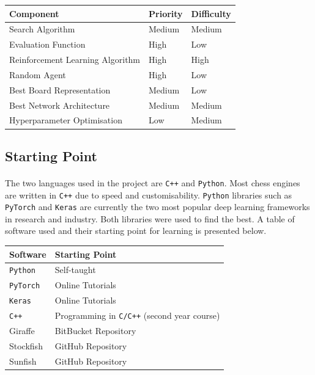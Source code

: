 \documentclass[12pt,a4paper]{book}
\begin{document}
\begin{center}
  \begin{tabular}{l | l  l}
    \hline
    \textbf{Component} & \textbf{Priority} & \textbf{Difficulty} \\ \hline
    Search Algorithm & Medium & Medium \\
    Evaluation Function & High & Low \\
    Reinforcement Learning Algorithm & High & High \\
    Random Agent & High & Low \\
    Best Board Representation & Medium & Low \\
    Best Network Architecture & Medium & Medium \\
    Hyperparameter Optimisation & Low & Medium \\
    \hline
  \end{tabular}
\end{center}


\subsection{Starting Point}

\paragraph{} The two languages used in the project are \texttt{C++} and \texttt{Python}. Most chess engines are written in \texttt{C++} due to speed and customisability. \texttt{Python} libraries such as \texttt{PyTorch} and \texttt{Keras} are currently the two most popular deep learning frameworks in research and industry. Both libraries were used to find the best. A table of software used and their starting point for learning is presented below.

\begin{center}
  \begin{tabular}{l | l}
    \hline
    \textbf{Software} & \textbf{Starting Point} \\ \hline
    \texttt{Python} & Self-taught \\
    \texttt{PyTorch} & Online Tutorials \\
    \texttt{Keras} & Online Tutorials \\
    \texttt{C++} & Programming in \texttt{C/C++} (second year course) \\
    Giraffe & BitBucket Repository \\
    Stockfish & GitHub Repository \\
    Sunfish & GitHub Repository \\
    \hline
  \end{tabular}
\end{center}
\end{document}
